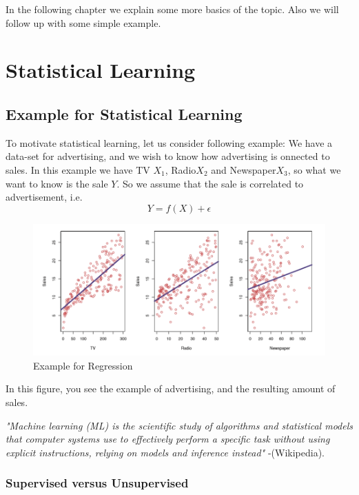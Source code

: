 \documentclass{article}
\begin{document}
\par
In the following chapter we explain some more basics of the topic. Also we will follow up with some simple example.


\newpage


\section{Statistical Learning}

\subsection{Example for Statistical Learning}

To motivate statistical learning, let us consider following example:
We have a data-set for advertising, and we wish to know how advertising is onnected to sales. In this example we have TV $X_1$, Radio$X_2$ and Newspaper$X_3$, so what we want to know is the sale $Y$. So we assume that the sale is correlated to advertisement, i.e.
$$Y = f(X) + \epsilon$$

\begin{figure}[ht]
    \centering
    \includegraphics[width=\textwidth]{Sales_2_1.png}
    \caption{Example for Regression}
    \label{fig:sales_example_lin_reg}
\end{figure}


In this figure, you see the example of advertising, and the resulting amount of sales. 

\textit{"Machine learning (ML) is the scientific study of algorithms and statistical models that computer systems use to effectively perform a specific task without using explicit instructions, relying on models and inference instead"} -(Wikipedia).

\subsubsection{Supervised versus Unsupervised}
\end{document}
